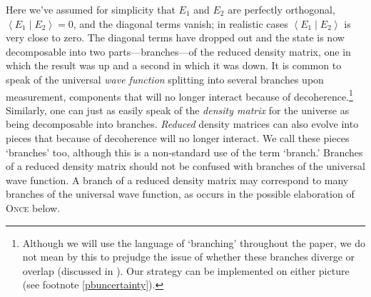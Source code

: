\documentclass[onecolumn,secnumarabic,amsmath,amssymb,balancelastpage,nofootinbib]{article}
\newcommand{\bracket}[2]{\ensuremath{\left\langle #1 \middle| #2 \right\rangle}}
\begin{document}
Here we've assumed for simplicity that $E_1$ and $E_2$ are perfectly orthogonal, $\bracket{E_1}{E_2}=0$, and the diagonal terms vanish; in realistic cases $\bracket{E_1}{E_2}$ is very close to zero.  The diagonal terms have dropped out and the state is now decomposable into two parts---branches---of the reduced density matrix, one in which the result was up and a second in which it was down.  It is common to speak of the universal \emph{wave function} splitting into several branches upon measurement, components that will no longer interact because of decoherence.\footnote{Although we will use the language of `branching' throughout the paper, we do not mean by this to prejudge the issue of whether these branches diverge or overlap (discussed in \citealp{saunders2010b,wilson2012b}).  Our strategy can be implemented on either picture (see footnote \ref{pbuncertainty}).}  Similarly, one can just as easily speak of the \emph{density matrix} for the universe as being decomposable into branches.  \emph{Reduced} density matrices can also evolve into pieces that because of decoherence will no longer interact.  We call these pieces `branches' too, although this is a non-standard use of the term `branch.'  Branches of a reduced density matrix should not be confused with branches of the universal wave function.  A branch of a reduced density matrix may correspond to many branches of the universal wave function, as occurs in the possible elaboration of \textsc{Once} below.
\end{document}
